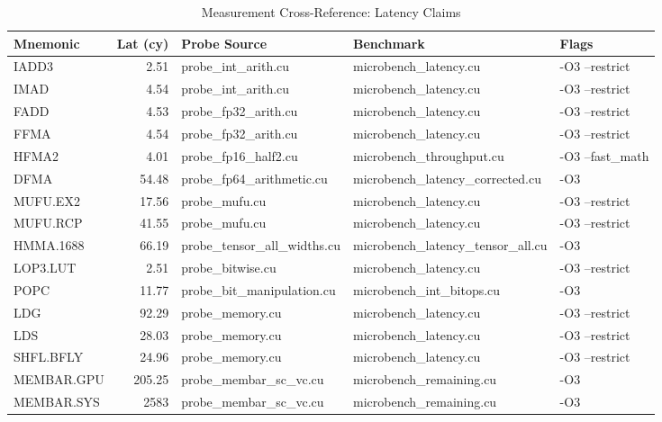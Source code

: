 \begin{table}[htbp]
\centering
\caption{Measurement Cross-Reference: Latency Claims}
\label{tab:crossref:latency}
\small
\renewcommand{\arraystretch}{1.1}
\begin{tabular}{@{}
  >{\color{fg}\ttfamily\small}l
  >{\color{fg}}r
  >{\color{fg}\ttfamily\scriptsize}l
  >{\color{fg}\ttfamily\scriptsize}l
  >{\color{fg}\scriptsize}l
@{}}
\toprule
\textcolor{muted}{\textsf{Mnemonic}} &
\textcolor{muted}{\textsf{Lat (cy)}} &
\textcolor{muted}{\textsf{Probe Source}} &
\textcolor{muted}{\textsf{Benchmark}} &
\textcolor{muted}{\textsf{Flags}} \\
\midrule
IADD3      &  2.51 & probe\_int\_arith.cu      & microbench\_latency.cu & -O3 --restrict \\
IMAD       &  4.54 & probe\_int\_arith.cu      & microbench\_latency.cu & -O3 --restrict \\
FADD       &  4.53 & probe\_fp32\_arith.cu     & microbench\_latency.cu & -O3 --restrict \\
FFMA       &  4.54 & probe\_fp32\_arith.cu     & microbench\_latency.cu & -O3 --restrict \\
HFMA2      &  4.01 & probe\_fp16\_half2.cu     & microbench\_throughput.cu & -O3 --fast\_math \\
DFMA       & 54.48 & probe\_fp64\_arithmetic.cu & microbench\_latency\_corrected.cu & -O3 \\
MUFU.EX2   & 17.56 & probe\_mufu.cu           & microbench\_latency.cu & -O3 --restrict \\
MUFU.RCP   & 41.55 & probe\_mufu.cu           & microbench\_latency.cu & -O3 --restrict \\
HMMA.1688  & 66.19 & probe\_tensor\_all\_widths.cu & microbench\_latency\_tensor\_all.cu & -O3 \\
LOP3.LUT   &  2.51 & probe\_bitwise.cu        & microbench\_latency.cu & -O3 --restrict \\
POPC       & 11.77 & probe\_bit\_manipulation.cu & microbench\_int\_bitops.cu & -O3 \\
LDG        & 92.29 & probe\_memory.cu          & microbench\_latency.cu & -O3 --restrict \\
LDS        & 28.03 & probe\_memory.cu          & microbench\_latency.cu & -O3 --restrict \\
SHFL.BFLY  & 24.96 & probe\_memory.cu          & microbench\_latency.cu & -O3 --restrict \\
MEMBAR.GPU &205.25 & probe\_membar\_sc\_vc.cu  & microbench\_remaining.cu & -O3 \\
MEMBAR.SYS &2583   & probe\_membar\_sc\_vc.cu  & microbench\_remaining.cu & -O3 \\
\bottomrule
\end{tabular}
\end{table}

